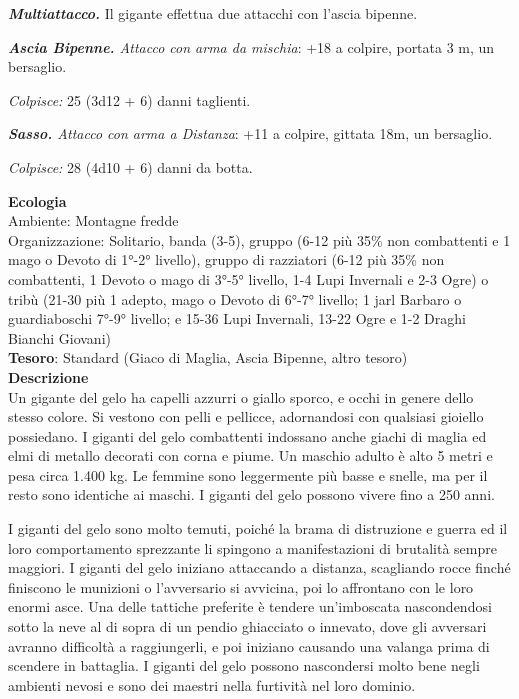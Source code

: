 \begin{multicols}{2}
\textit{\textbf{Multiattacco.}} Il gigante effettua due attacchi con l'ascia bipenne.

\textit{\textbf{Ascia Bipenne.} Attacco con arma da mischia}: +18 a colpire, portata 3 m, un bersaglio.

\textit{Colpisce:} 25 (3d12 + 6) danni taglienti.

\textit{\textbf{Sasso.} Attacco con arma a Distanza}: +11 a colpire, gittata 18m, un bersaglio.

\textit{Colpisce:} 28 (4d10 + 6) danni da botta.

\textbf{Ecologia}\\
Ambiente: Montagne fredde\\
Organizzazione: Solitario, banda (3-5), gruppo (6-12 più 35\% non combattenti e 1 mago o Devoto di 1°-2° livello), gruppo di razziatori (6-12 più 35\% non combattenti, 1 Devoto o mago di 3°-5° livello, 1-4 Lupi Invernali e 2-3 Ogre) o tribù (21-30 più 1 adepto, mago o Devoto di 6°-7° livello; 1 jarl Barbaro o guardiaboschi 7°-9° livello; e 15-36 Lupi Invernali, 13-22 Ogre e 1-2 Draghi Bianchi Giovani)\\
\textbf{Tesoro}: Standard (Giaco di Maglia, Ascia Bipenne, altro tesoro)\\
\textbf{Descrizione}\\
Un gigante del gelo ha capelli azzurri o giallo sporco, e occhi in genere dello stesso colore. Si vestono con pelli e pellicce, adornandosi con qualsiasi gioiello possiedano. I giganti del gelo combattenti indossano anche giachi di maglia ed elmi di metallo decorati con corna e piume. Un maschio adulto è alto 5 metri e pesa circa 1.400 kg. Le femmine sono leggermente più basse e snelle, ma per il resto sono identiche ai maschi. I giganti del gelo possono vivere fino a 250 anni.

I giganti del gelo sono molto temuti, poiché la brama di distruzione e guerra ed il loro comportamento sprezzante li spingono a manifestazioni di brutalità sempre maggiori. I giganti del gelo iniziano attaccando a distanza, scagliando rocce finché finiscono le munizioni o l'avversario si avvicina, poi lo affrontano con le loro enormi asce. Una delle tattiche preferite è tendere un'imboscata nascondendosi sotto la neve al di sopra di un pendio ghiacciato o innevato, dove gli avversari avranno difficoltà a raggiungerli, e poi iniziano causando una valanga prima di scendere in battaglia. I giganti del gelo possono nascondersi molto bene negli ambienti nevosi e sono dei maestri nella furtività nel loro dominio.


\end{multicols}
